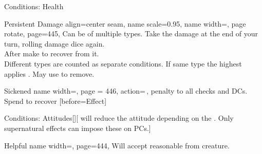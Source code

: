 \begin{PageFrontLandscape}
\begin{TablesHalf}{\frontTableHeight}
\begin{Table}{Conditions: Health}
            \begin{entry}{Persistent Damage}{%
                align=center seam,
                name scale=0.95,
                name width=\conditionLength,%
                page rotate,
                page=445,
            }
                Can be of multiple types. Take the damage at the end of your turn, rolling damage dice again.\hfill
                \\
                After make \Flat[][val=15] to recover from it. \hfill
                \\
                Different types are counted as separate conditions.
                If same type the highest applies . \hfill
                May use  to remove.
            \end{entry}
            \begin{entry}{Sickened}{%
                name width=\conditionLength,%
                page = 446,
                action=\,\X,
            }
                \Numb{-\X} \Status penalty to all checks and DCs. Spend  to recover
                [before=Effect]
                \hfill {}
            \end{entry}
        \end{Table}
        \TableSpace
        \begin{Table}{Conditions: Attitudes}[][ will reduce the attitude depending on the \GM.
        \quad Only supernatural effects can impose these on PCs.]
            \begin{entry}{Helpful}{%
                name width=\conditionLength,%
                page=444,
            }
                Will accept reasonable  from creature. \hfill

\end{entry}
\end{Table}
\end{TablesHalf}
\end{PageFrontLandscape}
